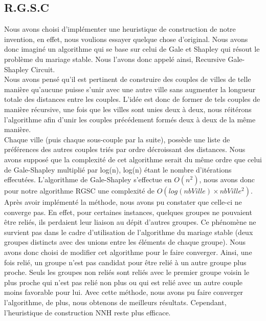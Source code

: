 \documentclass[12pt,a4paper]{article}
\begin{document}
\subsection{R.G.S.C}
Nous avons choisi d'implémenter une heuristique de construction de notre invention, en effet, nous voulions essayer quelque chose d'original. Nous avons donc imaginé un algorithme qui se base sur celui de Gale et Shapley qui résout le problème du mariage stable. Nous l'avons donc appelé ainsi, Recursive Gale-Shapley Circuit.\\

Nous avons pensé qu'il est pertinent de construire des couples de villes de telle manière qu'aucune puisse s'unir avec une autre ville sans augmenter la longueur totale des distances entre les couples. L'idée est donc de former de tels couples de manière récursive, une fois que les villes sont unies deux à deux, nous réitérons l'algorithme afin d'unir les couples précédement formés deux à deux de la même manière.\\

Chaque ville (puis chaque sous-couple par la suite), possède une liste de préférences des autres couples triés par ordre décroissant des distances. Nous avons supposé que la complexité de cet algorithme serait du même ordre que celui de Gale-Shapley multiplié par log(n), log(n) étant le nombre d'itérations effecutées. L'algorithme de Gale-Shapley s'effectue en $O(n^2)$, nous avons donc pour notre algorithme RGSC une complexité de $O(log(nbVille) \times nbVille ^2)$.\\

Après avoir implémenté la méthode, nous avons pu constater que celle-ci ne converge pas. En effet, pour certaines instances, quelques groupes ne pouvaient être reliés, ils perdaient leur liaison au dépit d'autres groupes. Ce phénomène ne survient pas dans le cadre d'utilisation de l'algorithme du mariage stable (deux groupes distincts avec des unions entre les éléments de chaque groupe). Nous avons donc choisi de modifier cet algorithme pour le faire converger. Ainsi, une fois relié, un groupe n'est pas candidat pour être relié à un autre groupe plus proche. Seuls les groupes non reliés sont reliés avec le premier groupe voisin le plus proche qui n'est pas relié non plus ou qui est relié avec un autre couple moins favorable pour lui. Avec cette méthode, nous avons pu faire converger l'algorithme, de plus, nous obtenons de meilleurs résultats. Cependant, l'heuristique de construction NNH reste plus efficace.\\
\end{document}
